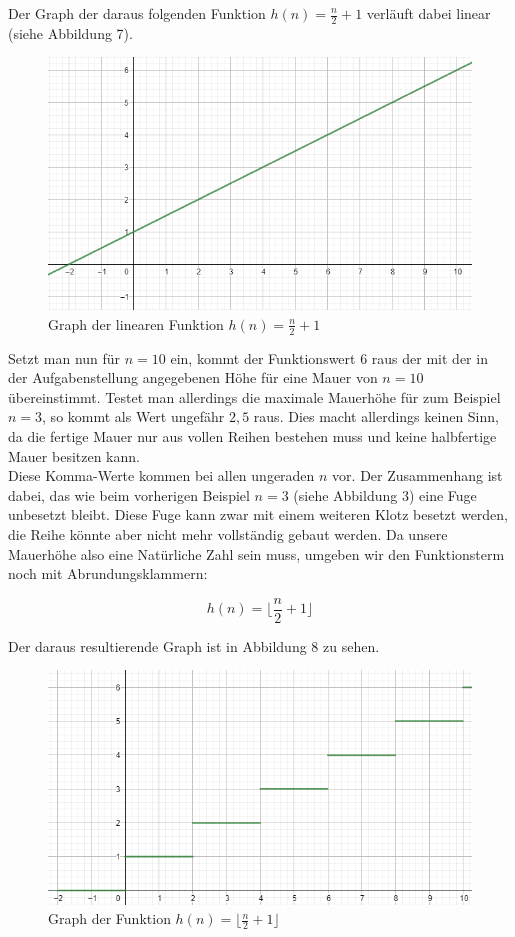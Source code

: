 \documentclass[a4paper,12pt]{article}
\begin{document}
Der Graph der daraus folgenden Funktion $h(n) = \frac{n}{2}+1$ verläuft dabei linear (siehe Abbildung 7).
\begin{figure}[H]
    \centering
    \includegraphics[width=0.95\linewidth]{Bilder/Aufgabe1/Graph_01.png}
    \caption{Graph der linearen Funktion $h(n) = \frac{n}{2}+1$}
\end{figure}
Setzt man nun für $n = 10$ ein, kommt der Funktionswert $6$ raus der mit der in der Aufgabenstellung angegebenen Höhe für eine Mauer von $n = 10$ übereinstimmt.
Testet man allerdings die maximale Mauerhöhe für zum Beispiel $n = 3$, so kommt als Wert ungefähr $2,5$ raus. Dies macht allerdings keinen Sinn, da die fertige Mauer nur aus vollen Reihen bestehen muss und keine halbfertige Mauer besitzen kann.
\\[0.4cm]
Diese Komma-Werte kommen bei allen ungeraden $n$ vor. Der Zusammenhang ist dabei, das wie beim vorherigen Beispiel $n = 3$ (siehe Abbildung 3) eine Fuge unbesetzt bleibt. Diese Fuge kann zwar mit einem weiteren Klotz besetzt werden, die Reihe könnte aber nicht mehr vollständig gebaut werden.
Da unsere Mauerhöhe also eine Natürliche Zahl sein muss, umgeben wir den Funktionsterm noch mit Abrundungsklammern:
\begin{center}
\begin{Large}
\[h(n) = \lfloor\frac{n}{2}+1\rfloor\]
\end{Large}
\end{center}
Der daraus resultierende Graph ist in Abbildung 8 zu sehen.
\begin{figure}[H]
    \centering
    \includegraphics[width=0.95\linewidth]{Bilder/Aufgabe1/Graph_02.png}
    \caption{Graph der Funktion $h(n) = \lfloor\frac{n}{2}+1\rfloor$}
\end{figure}
\end{document}
